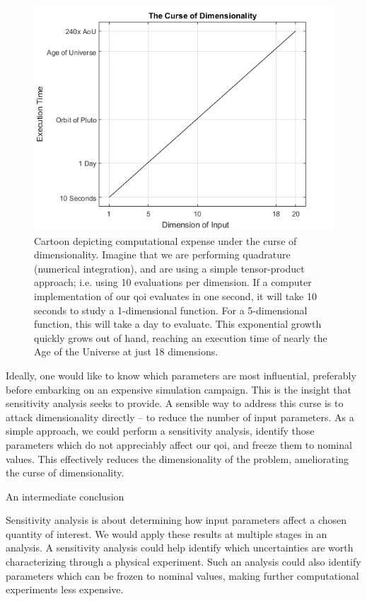 \documentclass[../primer.tex]{subfiles}
\begin{document}
\begin{figure}[htbp]
\centering
\includegraphics[width=.9\linewidth]{./images/curse_of_dimensionality.png}
\caption{Cartoon depicting computational expense under the curse of dimensionality. Imagine that we are performing quadrature (numerical integration), and are using a simple tensor-product approach; i.e. using 10 evaluations per dimension. If a computer implementation of our qoi evaluates in one second, it will take 10 seconds to study a 1-dimensional function. For a 5-dimensional function, this will take a day to evaluate. This exponential growth quickly grows out of hand, reaching an execution time of nearly the Age of the Universe at just 18 dimensions.}
\end{figure}

Ideally, one would like to know which parameters are most influential,
preferably before embarking on an expensive simulation campaign. This is the
insight that sensitivity analysis seeks to provide. A sensible way to address
this curse is to attack dimensionality directly -- to reduce the number of input
parameters. As a simple approach, we could perform a sensitivity analysis,
identify those parameters which do not appreciably affect our qoi, and freeze
them to nominal values. This effectively reduces the dimensionality of the
problem, ameliorating the curse of dimensionality.

An intermediate conclusion

Sensitivity analysis is about determining how input parameters affect a chosen
quantity of interest. We would apply these results at multiple stages in an
analysis. A sensitivity analysis could help identify which uncertainties are
worth characterizing through a physical experiment. Such an analysis could
also identify parameters which can be frozen to nominal values, making further
computational experiments less expensive.
\end{document}
